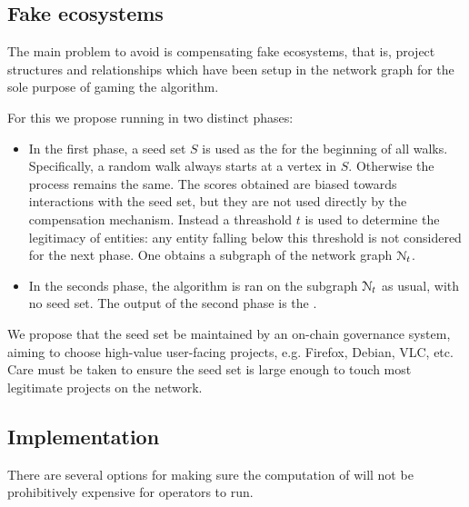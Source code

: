 \subsection{Fake ecosystems}

The main problem to avoid is compensating fake ecosystems, that is,
project structures and relationships which have been setup in the
network graph for the sole purpose of gaming the \osrank{} algorithm.

For this we propose running \osrank{} in two distinct phases:
\begin{itemize}
\item In the first phase, a seed set $S$ is used as the for the
  beginning of all walks. Specifically, a random walk always starts at
  a vertex in $S$. Otherwise the process remains the same. The scores
  obtained are biased towards interactions with the seed set, but they
  are not used directly by the compensation mechanism. Instead a
  threashold $t$ is used to determine the legitimacy of entities: any
  entity falling below this threshold is not considered for the next
  phase. One obtains a subgraph of the network graph $\mathcal{N}_t$.
\item In the seconds phase, the algorithm is ran on the subgraph
  $\mathcal{N}_t$ as usual, with no seed set. The output of the second
  phase is the \osrank{}.
\end{itemize}

We propose that the seed set be maintained by an on-chain governance
system, aiming to choose high-value user-facing projects,
e.g. Firefox, Debian, VLC, etc. Care must be taken to ensure the seed
set is large enough to touch most legitimate projects on the network.

\subsection{Implementation}

There are several options for making sure the computation of \osrank{}
will not be prohibitively expensive for operators to run.

